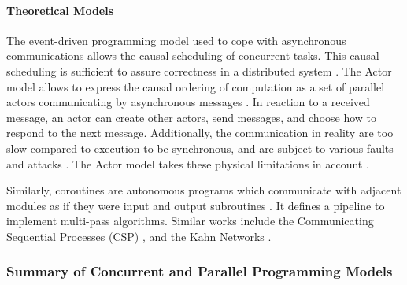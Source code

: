 \paragraph{Theoretical Models}

The event-driven programming model used to cope with asynchronous communications allows the causal scheduling of concurrent tasks.
This causal scheduling is sufficient to assure correctness in a distributed system \cite{Lamport1978,Reed2012}.
The Actor model allows to express the causal ordering of computation as a set of parallel actors communicating by asynchronous messages \cite{Hewitt1973a, Hewitt1977, Clinger1981}.
In reaction to a received message, an actor can create other actors, send messages, and choose how to respond to the next message.
Additionally, the communication in reality are too slow compared to execution to be synchronous, and are subject to various faults and attacks \cite{Lamport1982}.
The Actor model takes these physical limitations in account \cite{Hewitt1977a}.


Similarly, coroutines are autonomous programs which communicate with adjacent modules as if they were input and output subroutines \cite{Conway1963}.
It defines a pipeline to implement multi-pass algorithms.
Similar works include the Communicating Sequential Processes (CSP) \cite{Hoare1978, Brookes1984}, and the Kahn Networks \cite{Kahn1974, Kahn1976}.

\subsubsection{Summary of Concurrent and Parallel Programming Models}

